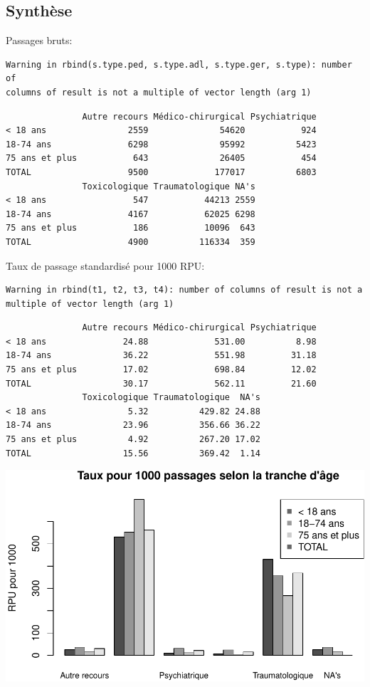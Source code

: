 \documentclass[]{article}
\begin{document}
\subsection{Synthèse}\label{synthese}

Passages bruts:

\begin{verbatim}
Warning in rbind(s.type.ped, s.type.adl, s.type.ger, s.type): number of
columns of result is not a multiple of vector length (arg 1)
\end{verbatim}

\begin{verbatim}
               Autre recours Médico-chirurgical Psychiatrique
< 18 ans                2559              54620           924
18-74 ans               6298              95992          5423
75 ans et plus           643              26405           454
TOTAL                   9500             177017          6803
               Toxicologique Traumatologique NA's
< 18 ans                 547           44213 2559
18-74 ans               4167           62025 6298
75 ans et plus           186           10096  643
TOTAL                   4900          116334  359
\end{verbatim}

Taux de passage standardisé pour 1000 RPU:

\begin{verbatim}
Warning in rbind(t1, t2, t3, t4): number of columns of result is not a
multiple of vector length (arg 1)
\end{verbatim}

\begin{verbatim}
               Autre recours Médico-chirurgical Psychiatrique
< 18 ans               24.88             531.00          8.98
18-74 ans              36.22             551.98         31.18
75 ans et plus         17.02             698.84         12.02
TOTAL                  30.17             562.11         21.60
               Toxicologique Traumatologique  NA's
< 18 ans                5.32          429.82 24.88
18-74 ans              23.96          356.66 36.22
75 ans et plus          4.92          267.20 17.02
TOTAL                  15.56          369.42  1.14
\end{verbatim}

\includegraphics{analyse_merge_files/figure-latex/synthese2-1.pdf}\\
\end{document}
